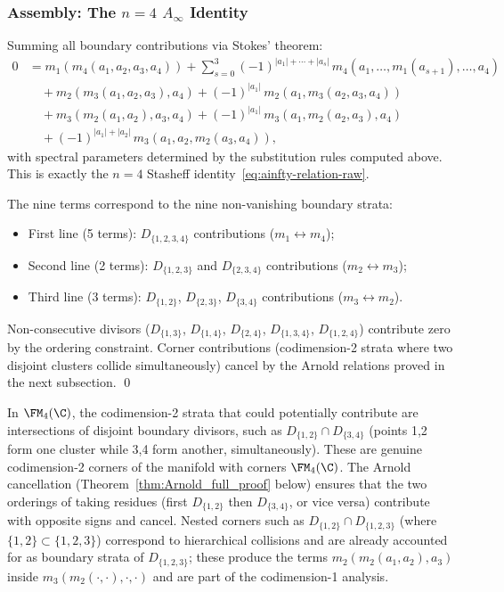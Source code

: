 \subsubsection{Assembly: The $n=4$ $A_\infty$ Identity}

\begin{proposition}[Complete $k=4$ verification; \ClaimStatusProvedHere]
\label{prop:k4_identity}
Summing all boundary contributions via Stokes' theorem:
\begin{align*}
0 &= m_1(m_4(a_1,a_2,a_3,a_4)) + \sum_{s=0}^{3} (-1)^{|a_1|+\cdots+|a_s|}\, m_4(a_1,\ldots,m_1(a_{s+1}),\ldots,a_4) \\
&\quad + m_2(m_3(a_1,a_2,a_3),a_4) + (-1)^{|a_1|}\, m_2(a_1,m_3(a_2,a_3,a_4)) \\
&\quad + m_3(m_2(a_1,a_2),a_3,a_4) + (-1)^{|a_1|}\, m_3(a_1,m_2(a_2,a_3),a_4) \\
&\quad + (-1)^{|a_1|+|a_2|}\, m_3(a_1,a_2,m_2(a_3,a_4)),
\end{align*}
with spectral parameters determined by the substitution rules computed above. This is exactly the $n=4$ Stasheff identity~\eqref{eq:ainfty-relation-raw}.

The nine terms correspond to the nine non-vanishing boundary strata:
\begin{itemize}
\item First line (5 terms): $D_{\{1,2,3,4\}}$ contributions ($m_1 \leftrightarrow m_4$);
\item Second line (2 terms): $D_{\{1,2,3\}}$ and $D_{\{2,3,4\}}$ contributions ($m_2 \leftrightarrow m_3$);
\item Third line (3 terms): $D_{\{1,2\}}$, $D_{\{2,3\}}$, $D_{\{3,4\}}$ contributions ($m_3 \leftrightarrow m_2$).
\end{itemize}
Non-consecutive divisors ($D_{\{1,3\}}$, $D_{\{1,4\}}$, $D_{\{2,4\}}$, $D_{\{1,3,4\}}$, $D_{\{1,2,4\}}$) contribute zero by the ordering constraint. Corner contributions (codimension-2 strata where two disjoint clusters collide simultaneously) cancel by the Arnold relations proved in the next subsection. \qed
\end{proposition}

\begin{remark}
\label{rem:k4_corners}
In $\FM_4(\C)$, the codimension-2 strata that could potentially contribute are intersections of disjoint boundary divisors, such as $D_{\{1,2\}} \cap D_{\{3,4\}}$ (points 1,2 form one cluster while 3,4 form another, simultaneously). These are genuine codimension-2 corners of the manifold with corners $\FM_4(\C)$. The Arnold cancellation (Theorem~\ref{thm:Arnold_full_proof} below) ensures that the two orderings of taking residues (first $D_{\{1,2\}}$ then $D_{\{3,4\}}$, or vice versa) contribute with opposite signs and cancel. Nested corners such as $D_{\{1,2\}} \cap D_{\{1,2,3\}}$ (where $\{1,2\} \subset \{1,2,3\}$) correspond to hierarchical collisions and are already accounted for as boundary strata of $D_{\{1,2,3\}}$; these produce the terms $m_2(m_2(a_1,a_2),a_3)$ inside $m_3(m_2(\cdot,\cdot),\cdot,\cdot)$ and are part of the codimension-1 analysis.
\end{remark}


